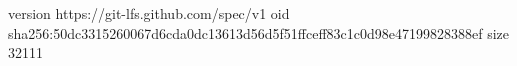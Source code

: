 version https://git-lfs.github.com/spec/v1
oid sha256:50dc3315260067d6cda0dc13613d56d5f51ffceff83c1c0d98e47199828388ef
size 32111
